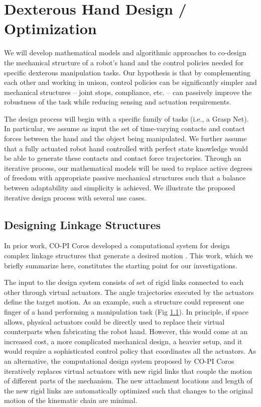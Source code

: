 \section{Dexterous Hand Design / Optimization}
  \label{secHandDesign}


We will develop mathematical models and algorithmic approaches to co-design the mechanical structure of a robot's hand and the control policies needed for specific dexterous manipulation tasks. Our hypothesis is that by complementing each other and working in unison, control policies can be significantly simpler and mechanical structures -- joint stops, compliance, etc. -- can passively improve the robustness of the task while reducing sensing and actuation requirements. 

The design process will begin with a specific family of tasks (i.e., a Grasp Net). In particular, we assume as input the set of time-varying contacts and contact forces between the hand and the object being manipulated. We further assume that a fully actuated robot hand controlled with perfect state knowledge would be able to generate these contacts and contact force trajectories. Through an iterative process, our mathematical models will be used to replace active degrees of freedom with appropriate passive mechanical structures such that a balance between adaptability and simplicity is achieved. We illustrate the proposed iterative design process with several use cases.

\subsection{Designing Linkage Structures}

In prior work, CO-PI Coros developed a computational system for design complex linkage structures that generate a desired motion \cite{}. This work, which we briefly summarize here, constitutes the starting point for our investigations.

The input to the design system consists of set of rigid links connected to each other through virtual actuators. The angle trajectories executed by the actuators define the target motion. As an example, such a structure could represent one finger of a hand performing a manipulation task (Fig \ref{}). In principle, if space allows, physical actuators could be directly used to replace their virtual counterparts when fabricating the robot hand. However, this would come at an increased cost, a more complicated mechanical design, a heavier setup, and it would require a sophisticated control policy that coordinates all the actuators. As an alternative, the computational design system proposed by CO-PI Coros iteratively replaces virtual actuators with new rigid links that couple the motion of different parts of the mechanism. The new attachment locations and length of the new rigid links are automatically optimized such that changes to the original motion of the kinematic chain are minimal.

